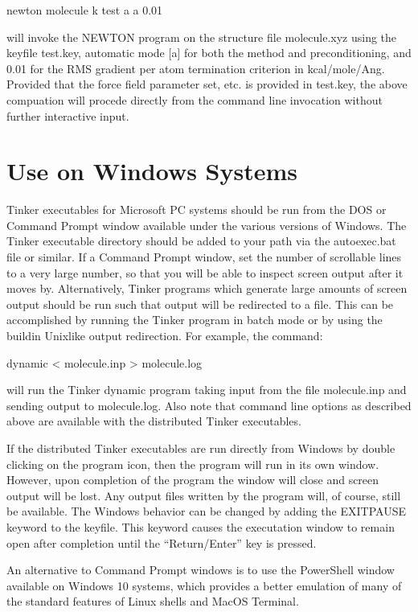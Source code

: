 \documentclass[letterpaper,11pt,english]{sphinxmanual}
\begin{document}
newton molecule \sphinxhyphen{}k test a a 0.01

will invoke the NEWTON program on the structure file molecule.xyz using the keyfile test.key, automatic mode {[}a{]} for both the method and preconditioning, and 0.01 for the RMS gradient per atom termination criterion in kcal/mole/Ang. Provided that the force field parameter set, etc. is provided in test.key, the above compuation will procede directly from the command line invocation without further interactive input.


\section{Use on Windows Systems}
\label{\detokenize{text/special-features:use-on-windows-systems}}
Tinker executables for Microsoft PC systems should be run from the DOS or Command Prompt window available under the various versions of Windows. The Tinker executable directory should be added to your path via the autoexec.bat file or similar. If a Command Prompt window, set the number of scrollable lines to a very large number, so that you will be able to inspect screen output after it moves by. Alternatively, Tinker programs which generate large amounts of screen output should be run such that output will be redirected to a file. This can be accomplished by running the Tinker program in batch mode or by using the build\sphinxhyphen{}in Unix\sphinxhyphen{}like output redirection. For example, the command:

dynamic \textless{} molecule.inp \textgreater{} molecule.log

will run the Tinker dynamic program taking input from the file molecule.inp and sending output to molecule.log. Also note that command line options as described above are available with the distributed Tinker executables.

If the distributed Tinker executables are run directly from Windows by double clicking on the program icon, then the program will run in its own window. However, upon completion of the program the window will close and screen output will be lost. Any output files written by the program will, of course, still be available. The Windows behavior can be changed by adding the EXIT\sphinxhyphen{}PAUSE keyword to the keyfile. This keyword causes the executation window to remain open after completion until the “Return/Enter” key is pressed.

An alternative to Command Prompt windows is to use the PowerShell window available on Windows 10 systems, which provides a better emulation of many of the standard features of Linux shells and MacOS Terminal.
\end{document}
